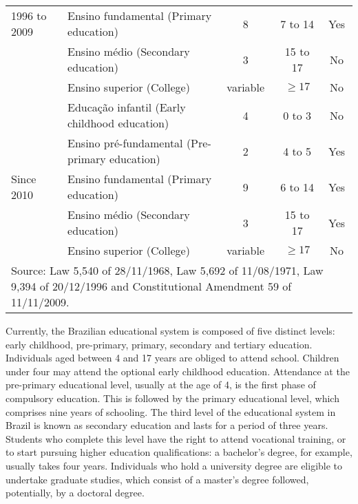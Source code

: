 \documentclass[a4paper, 12pt]{article}
\begin{document}
\begin{table}[H]
\begin{adjustbox}{width=\textwidth,totalheight=\textheight,keepaspectratio}
\begin{tabular}{ccccc}
    \multicolumn{1}{l}{1996 to 2009} & \multicolumn{1}{l}{Ensino fundamental (Primary education)} & 8     & 7 to 14 & Yes \\
          & \multicolumn{1}{l}{Ensino médio (Secondary education)} & 3     & 15 to 17 & No \\
          & \multicolumn{1}{l}{Ensino superior (College)} & variable   & $\geq17$  & No \\
    \midrule
    & \multicolumn{1}{l}{Educação infantil (Early childhood education)} & 4     & 0 to 3 & No \\
    & \multicolumn{1}{l}{Ensino pré-fundamental (Pre-primary education)} & 2     & 4 to 5 & Yes \\
    \multicolumn{1}{l}{Since 2010} & \multicolumn{1}{l}{Ensino fundamental (Primary education)} & 9     & 6 to 14 & Yes \\
          & \multicolumn{1}{l}{Ensino médio (Secondary education)} & 3     & 15 to 17 & Yes \\
          & \multicolumn{1}{l}{Ensino superior (College)} & variable   & $\geq17$  & No \\
    \midrule
    \multicolumn{5}{l}{\small{Source: Law 5,540 of 28/11/1968, Law 5,692 of 11/08/1971, Law 9,394 of 20/12/1996 and Constitutional Amendment 59 of 11/11/2009.}} \\
   \end{tabular}%
  \label{tab:EducationSystem}%
  \end{adjustbox}	
\end{table}%



Currently, the Brazilian educational system is composed of five distinct levels: early childhood, pre-primary, primary, secondary and tertiary education. Individuals aged between 4 and 17 years are obliged to attend school. Children under four may attend the optional early childhood education. Attendance at the pre-primary educational level, usually at the age of 4, is the first phase of compulsory education. This is followed by the primary educational level, which comprises nine years of schooling. The third level of the educational system in Brazil is known as secondary education and lasts for a period of three years. Students who complete this level have the right to attend vocational training, or to start pursuing higher education qualifications: a bachelor’s degree, for example, usually takes four years. Individuals who hold a university degree are eligible to undertake graduate studies, which consist of a master’s degree followed, potentially, by a doctoral degree.
\end{document}
